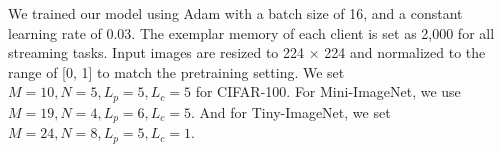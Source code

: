 \documentclass[sigconf,anonymous,review,screen]{acmart}
\begin{document}
We trained our model using Adam \cite{kingma2014method} with a batch size of 16, and a constant learning rate of 0.03. The exemplar memory of each client is set as 2,000 for all streaming tasks. Input images are resized to 224 $\times$ 224 and normalized to the range of [0, 1] to match the pretraining setting. We set $M = 10, N = 5, L_p = 5, L_c = 5$ for CIFAR-100. For Mini-ImageNet, we use $M = 19, N = 4, L_p = 6, L_c = 5$. And for Tiny-ImageNet, we set $M = 24, N = 8, L_p=5, L_c = 1$. 







\end{document}
